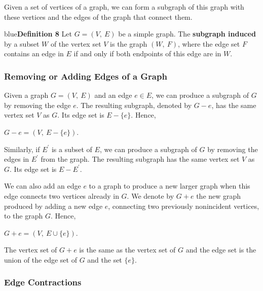 \documentclass[11pt]{article}
\newenvironment{definition}[1]{\begin{mybox}{blue}{\textbf{Definition #1}}}{\end{mybox}}
\begin{document}
Given a set of vertices of a graph, we can form a subgraph of this graph with these vertices and the edges of the graph that connect them.

\begin{definition}{8}
Let $G = (V,\ E)$ be a simple graph. The \textbf{subgraph induced} by a subset $W$ of the vertex set $V$ is the graph $(W,\ F)$, where the edge set $F$ contains an edge in $E$ if and only if both endpoints of this edge are in $W$.
\end{definition}

\subsubsection{Removing or Adding Edges of a Graph} 

Given a graph $G = (V,\ E)$ and an edge $e \in E$, we can produce a subgraph of $G$ by removing the edge $e$. The resulting subgraph, denoted by $G - e$, has the same vertex set $V$ as $G$. Its edge set is $E - \{e\}$. Hence,

$G - e = (V,\ E - \{e\})$.

\noindent Similarly, if $E^{'}$ is a subset of $E$, we can produce a subgraph of $G$ by removing the edges in $E^{'}$ from the graph. The resulting subgraph has the same vertex set $V$ as $G$. Its edge set is $E - E^{'}$.

We can also add an edge $e$ to a graph to produce a new larger graph when this edge connects two vertices already in $G$. We denote by $G + e$ the new graph produced by adding a new edge $e$, connecting two previously nonincident vertices, to the graph $G$. Hence,

$G + e = (V,\ E \cup \{e\})$.

\noindent The vertex set of $G + e$ is the same as the vertex set of $G$ and the edge set is the union of the edge set of $G$ and the set $\{e\}$.

\subsubsection{Edge Contractions}
\end{document}
